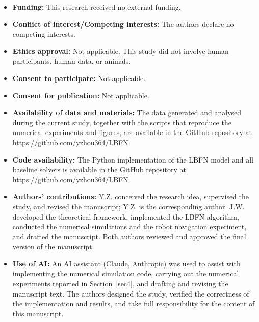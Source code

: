 \documentclass[pdflatex,sn-mathphys,Numbered]{sn-jnl}
\theoremstyle{thmstyleone}
\theoremstyle{thmstyletwo}
\theoremstyle{thmstylethree}
\begin{document}
\begin{itemize}
\item \textbf{Funding:} This research received no external funding.
\item \textbf{Conflict of interest/Competing interests:} The authors declare no competing interests.
\item \textbf{Ethics approval:} Not applicable. This study did not involve human participants, human data, or animals.
\item \textbf{Consent to participate:} Not applicable.
\item \textbf{Consent for publication:} Not applicable.
\item \textbf{Availability of data and materials:} The data generated and analysed during the current study, together with the scripts that reproduce the numerical experiments and figures, are available in the GitHub repository at \url{https://github.com/yzhou364/LBFN}.
\item \textbf{Code availability:} The Python implementation of the LBFN model and all baseline solvers is available in the GitHub repository at \url{https://github.com/yzhou364/LBFN}.
\item \textbf{Authors' contributions:} Y.Z. conceived the research idea, supervised the study, and revised the manuscript; Y.Z. is the corresponding author. J.W. developed the theoretical framework, implemented the LBFN algorithm, conducted the numerical simulations and the robot navigation experiment, and drafted the manuscript. Both authors reviewed and approved the final version of the manuscript.
\item \textbf{Use of AI:} An AI assistant (Claude, Anthropic) was used to assist with implementing the numerical simulation code, carrying out the numerical experiments reported in Section~\ref{sec4}, and drafting and revising the manuscript text. The authors designed the study, verified the correctness of the implementation and results, and take full responsibility for the content of this manuscript.
\end{itemize}
\end{document}
